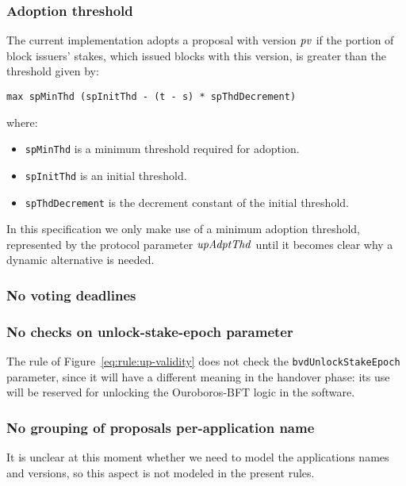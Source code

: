 \subsubsection{Adoption threshold}
\label{sec:adoption-threshold}

The current implementation adopts a proposal with version $\mathit{pv}$ if the
portion of block issuers' stakes, which issued blocks with this version, is
greater than the threshold given by:

\begin{lstlisting}
max spMinThd (spInitThd - (t - s) * spThdDecrement)
\end{lstlisting}

where:
\begin{itemize}
\item \lstinline{spMinThd} is a minimum threshold required for adoption.
\item \lstinline{spInitThd} is an initial threshold.
\item \lstinline{spThdDecrement} is the decrement constant of the initial
  threshold.
\end{itemize}

In this specification we only make use of a minimum adoption threshold,
represented by the protocol parameter $\mathit{upAdptThd}$ until it becomes clear
why a dynamic alternative is needed.

\subsubsection{No voting deadlines}
\label{sec:no-voting-deadlines}

\subsubsection{No checks on unlock-stake-epoch parameter}
\label{sec:no-unlock-stake-epoch-check}

The rule of Figure~\ref{eq:rule:up-validity} does not check the
\lstinline{bvdUnlockStakeEpoch} parameter, since it will have a different
meaning in the handover phase: its use will be reserved for unlocking the
Ouroboros-BFT logic in the software.

\subsubsection{No grouping of proposals per-application name}
\label{sec:no-app-up-grouping}

It is unclear at this moment whether we need to model the applications names
and versions, so this aspect is not modeled in the present rules.

